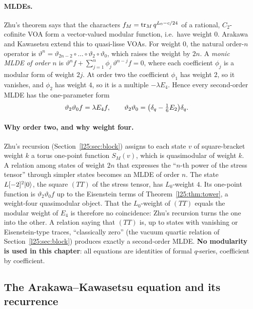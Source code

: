 \paragraph{MLDEs.} Zhu's theorem says that the characters $f_M=\operatorname{tr}_Mq^{L_0-c/24}$ of a rational, $C_2$-cofinite VOA
form a vector-valued modular function, i.e.\ have weight $0$. Arakawa and Kawasetsu extend this to quasi-lisse VOAs.
For weight $0$, the natural order-$n$ operator is
$\vartheta^n=\vartheta_{2n-2}\circ\dots\circ\vartheta_2\circ\vartheta_0$, which raises the weight by $2n$. A
\emph{monic MLDE of order $n$} is
$\vartheta^nf+\sum_{j=1}^{n}\phi_j\,\vartheta^{n-j}f=0$, where each coefficient $\phi_j$ is a modular form of weight
$2j$. At order two the coefficient $\phi_1$ has weight $2$, so it vanishes, and $\phi_2$ has weight $4$, so it is a
multiple $-\lambda E_4$. Hence every second-order MLDE has the one-parameter form
\begin{equation*}
\vartheta_2\vartheta_0f=\lambda E_4f,\qquad \vartheta_2\vartheta_0=\big(\delta_q-\tfrac16E_2\big)\delta_q .
\end{equation*}

\paragraph{Why order two, and why weight four.} Zhu's recursion (Section~\ref{l25:sec:block}) assigns to each state
$v$ of square-bracket weight $k$ a torus one-point function $S_M(v)$, which is quasimodular of weight $k$. A relation
among states of weight $2n$ that expresses the ``$n$-th power of the stress tensor'' through simpler states becomes an
MLDE of order $n$. The state $L[-2]^2|0\rangle$, the square $(TT)$ of the stress tensor, has $L_0$-weight $4$.
Its one-point function is $\vartheta_2\vartheta_0f$ up to the Eisenstein terms of Theorem~\ref{l25:thm:tower}, a
weight-four quasimodular object. That the $L_0$-weight of $(TT)$ equals the modular weight of $E_4$ is therefore no
coincidence: Zhu's recursion turns the one into the other. A relation saying that $(TT)$ is, up to states with
vanishing or Eisenstein-type traces, ``classically zero'' (the vacuum quartic relation of
Section~\ref{l25:sec:block}) produces exactly a second-order MLDE. \textbf{No modularity is used in this chapter}: all
equations are identities of formal $q$-series, coefficient by coefficient.

\subsection{The Arakawa--Kawasetsu equation and its recurrence}

